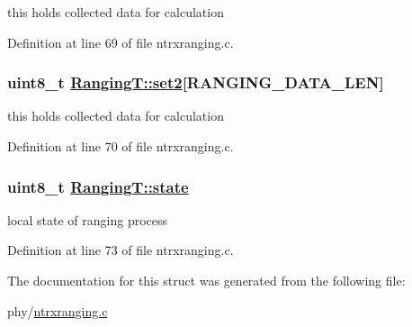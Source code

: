 this holds collected data for calculation 

Definition at line 69 of file ntrxranging.c.\hypertarget{structRangingT_65e8530970fa6a0345100b05ad59aefa}{
\subsubsection[set2]{\setlength{\rightskip}{0pt plus 5cm}uint8\_\-t \hyperlink{structRangingT_65e8530970fa6a0345100b05ad59aefa}{Ranging\-T::set2}\mbox{[}RANGING\_\-DATA\_\-LEN\mbox{]}}}
\label{structRangingT_65e8530970fa6a0345100b05ad59aefa}


this holds collected data for calculation 

Definition at line 70 of file ntrxranging.c.\hypertarget{structRangingT_ba98588af40243a4178517deb33d22a6}{
\subsubsection[state]{\setlength{\rightskip}{0pt plus 5cm}uint8\_\-t \hyperlink{structRangingT_ba98588af40243a4178517deb33d22a6}{Ranging\-T::state}}}
\label{structRangingT_ba98588af40243a4178517deb33d22a6}


local state of ranging process 

Definition at line 73 of file ntrxranging.c.

The documentation for this struct was generated from the following file:\begin{CompactItemize}
\item 
phy/\hyperlink{ntrxranging_8c}{ntrxranging.c}\end{CompactItemize}
